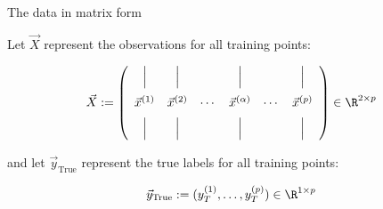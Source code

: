 
\begin{frame}{The data in matrix form}

Let $\vec X$ represent the observations for all training points:

\begin{equation}
\vec X := 
\left(
\begin{array}{cccccc}
\Big| & \Big| & & \Big| & & \Big| \\[3mm]
\vec x^{(1)} & \vec x^{(2)} & \cdots & \vec x^{(\alpha)} & \cdots & \vec x^{(p)}\\[2mm]
\Big| & \Big| & & \Big| & & \Big|
\end{array}
\right) \in \R^{2 \times p}
\end{equation}

and let $\vec y_{\text{True}}$ represent the true labels for all training points:

\begin{equation}
\vec y_{\text{True}} := (y_T^{(1)}, \ldots, y_T^{(p)}) \in \R^{1 \times p}
\end{equation}

\end{frame}

